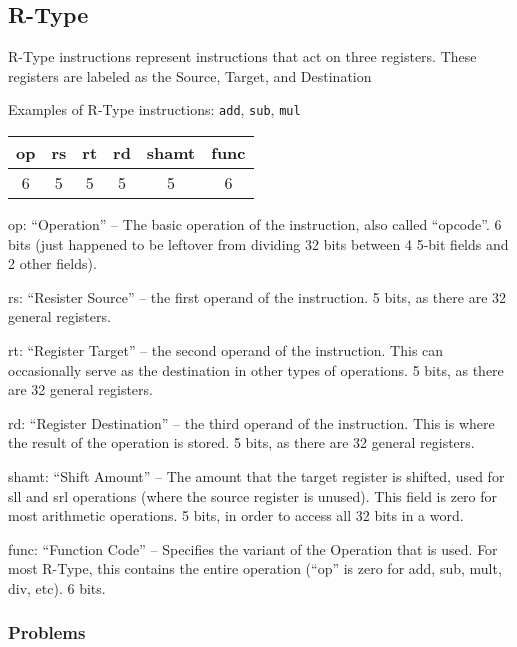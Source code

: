\documentclass{article}
\begin{document}
\subsection{R-Type}\label{RType}
R-Type instructions represent instructions that act on three registers. These registers are labeled as the Source, Target, and Destination

Examples of R-Type instructions: \texttt{add}, \texttt{sub}, \texttt{mul}

\begin{tabular}{|c|c|c|c|c|c|}
    \hline
    op & rs & rt & rd & shamt & func \\
    \hline
    6 & 5 & 5 & 5 & 5 & 6 \\ 
    \hline
\end{tabular}

op: ``Operation'' -- The basic operation of the instruction, also called ``opcode''. 6 bits (just happened to be leftover from dividing 32 bits between 4 5-bit fields and 2 other fields).

rs: ``Resister Source'' -- the first operand of the instruction. 5 bits, as there are 32 general registers. 

rt: ``Register Target'' -- the second operand of the instruction. This can occasionally serve as the destination in other types of operations. 5 bits, as there are 32 general registers. 

rd: ``Register Destination'' -- the third operand of the instruction. This is where the result of the operation is stored. 5 bits, as there are 32 general registers. 

shamt: ``Shift Amount'' -- The amount that the target register is shifted, used for sll and srl operations (where the source register is unused). This field is zero for most arithmetic operations. 5 bits, in order to access all 32 bits in a word.

func: ``Function Code'' -- Specifies the variant of the Operation that is used. For most R-Type, this contains the entire operation (``op'' is zero for add, sub, mult, div, etc). 6 bits.

\subsubsection{Problems}\label{RTypeProblems}

\end{document}
